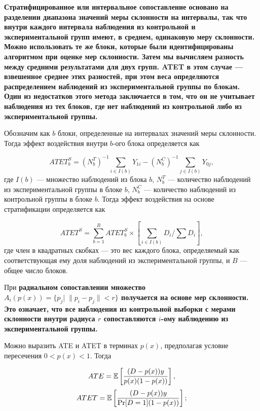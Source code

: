 \bfseries Стратифицированное \mdseries или \bfseries интервальное сопоставление \mdseries основано на разделении диапазона значений меры склонности на интервалы, так что внутри каждого интервала наблюдения из контрольной и экспериментальной групп имеют, в среднем, одинаковую меру склонности. Можно использовать те же блоки, которые были идентифицированы алгоритмом при оценке мер склонности. Затем мы вычисляем разность между средними результатами для двух групп. ATET в этом случае --- взвешенное среднее этих разностей, при этом веса определяются распределением наблюдений из экспериментальной группы по блокам. Один из недостатков этого метода заключается в том, что он не учитывает наблюдения из тех блоков, где нет наблюдений из контрольной либо из экспериментальной группы. 

Обозначим как $b$ блоки, определенные на интервалах значений меры склонности. Тогда эффект воздействия внутри $b$-ого блока определяется как

$$
ATET_b^S = (N_b^T)^{-1} \sum_{i \in I(b)} Y_{1i} - (N_b^C)^{-1} \sum_{j \in I(b)} Y_{0j},
$$
где $I(b)$ --- множество наблюдений из блока $b$, $N_b^T$ --- количество наблюдений из экспериментальной группы в блоке $b$, $N_b^C$ --- количество наблюдений из контрольной группы в блоке $b$. Тогда эффект воздействия на основе стратификации определяется как

\begin{equation}
\label{eq25.43}
ATET^S = \sum_{b=1}^B ATET_b^S \times \left[ \sum_{i \in I(b)} D_i / \sum D_i \right], 
\end{equation}
где член в квадратных скобках --- это вес каждого блока, определяемый как соответствующая ему доля наблюдений из экспериментальной группы, и $B$ --- общее число блоков. 

При \bfseries радиальном сопоставлении \mdseries множество $A_i (p(x)) = \{ p_j \bigl| \; \|p_i - p_j \| < r \}$ получается на основе мер склонности. Это означает, что все наблюдения из контрольной выборки с мерами склонности внутри радиуса $r$ сопоставляются $i$-ому наблюдению из экспериментальной группы. 

Можно выразить ATE и ATET в терминах $p(x)$, предполагая условие пересечения $0 < p(x) < 1$. Тогда

\begin{equation}
\label{eq25.44}
ATE = \mathbb{E} \left[  \frac{(D - p(x)) y}{p(x)(1 - p(x))}  \right],
\end{equation}
\begin{equation}
\label{eq25.45}
ATET = \mathbb{E} \left[  \frac{(D - p(x)) y}{\mathrm{Pr}[D = 1](1 - p(x))}  \right];
\end{equation}

